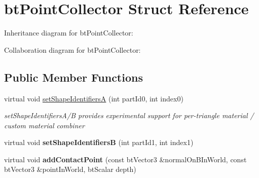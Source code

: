 \hypertarget{structbt_point_collector}{\section{bt\+Point\+Collector Struct Reference}
\label{structbt_point_collector}
}


Inheritance diagram for bt\+Point\+Collector\+:


Collaboration diagram for bt\+Point\+Collector\+:
\subsection*{Public Member Functions}
\begin{DoxyCompactItemize}
\item 
\hypertarget{structbt_point_collector_ac29e8e1a123f46faf555910bd9bc41b6}{virtual void \hyperlink{structbt_point_collector_ac29e8e1a123f46faf555910bd9bc41b6}{set\+Shape\+Identifiers\+A} (int part\+Id0, int index0)}\label{structbt_point_collector_ac29e8e1a123f46faf555910bd9bc41b6}

\begin{DoxyCompactList}\small\item\em set\+Shape\+Identifiers\+A/\+B provides experimental support for per-\/triangle material / custom material combiner \end{DoxyCompactList}\item 
\hypertarget{structbt_point_collector_a0cdf57ed98596e4cad8385a13fff12ea}{virtual void {\bfseries set\+Shape\+Identifiers\+B} (int part\+Id1, int index1)}\label{structbt_point_collector_a0cdf57ed98596e4cad8385a13fff12ea}

\item 
\hypertarget{structbt_point_collector_afaf449bb17d0d62afe2a7f8f54318c3b}{virtual void {\bfseries add\+Contact\+Point} (const bt\+Vector3 \&normal\+On\+B\+In\+World, const bt\+Vector3 \&point\+In\+World, bt\+Scalar depth)}\label{structbt_point_collector_afaf449bb17d0d62afe2a7f8f54318c3b}

\end{DoxyCompactItemize}
